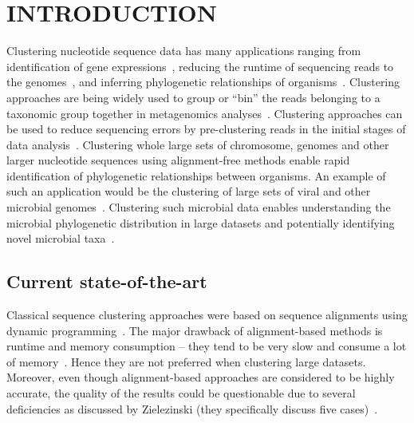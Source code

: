 \section{INTRODUCTION}

Clustering nucleotide sequence data has many applications ranging from
identification of gene expressions~\cite{hazelhurst-11}, reducing the
runtime of sequencing reads to the
genomes~\cite{rao-10,hazelhurst-08}, and inferring phylogenetic
relationships of organisms~\cite{cybis-18,solovyov-09,wei-12}.
Clustering approaches are being widely used to group or ``bin'' the
reads belonging to a taxonomic group together in metagenomics
analyses~\cite{sedlar-17}. Clustering approaches can be used to reduce
sequencing errors by pre-clustering reads in the initial stages of
data analysis~\cite{kozich-13}.  Clustering whole large sets of
chromosome, genomes and other larger nucleotide sequences using
alignment-free methods enable rapid identification of phylogenetic
relationships between organisms. An example of such an application
would be the clustering of large sets of viral and other microbial
genomes~\cite{delgado-15,solovyov-09,wei-12}. Clustering such
microbial data enables understanding the microbial phylogenetic
distribution in large datasets and potentially identifying novel
microbial taxa~\cite{wei-12}.

\subsection{Current state-of-the-art}

Classical sequence clustering approaches were based on sequence
alignments using dynamic
programming~\cite{morrison-15,sievers-14,thompson-03}. The major
drawback of alignment-based methods is runtime and memory consumption
-- \ie\/ they tend to be very slow and consume a lot of
memory~\cite{zielezinski-17}. Hence they are not preferred when
clustering large datasets. Moreover, even though alignment-based
approaches are considered to be highly accurate, the quality of the
results could be questionable due to several deficiencies as discussed
by Zielezinski \etal\/ (they specifically discuss five
cases)~\cite{zielezinski-17}.


